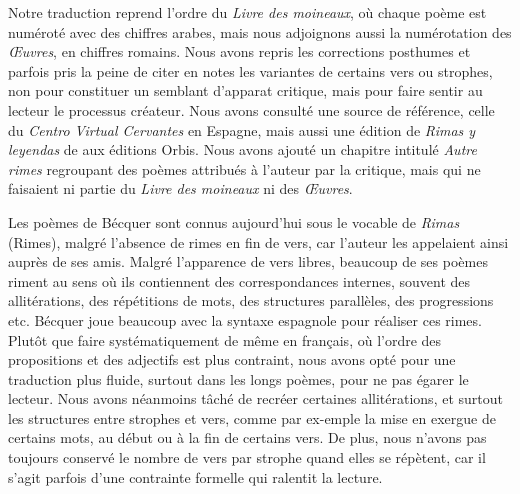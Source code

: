 






Notre traduction reprend l'ordre du \emph{Livre des moineaux}, où
chaque poème est numéroté avec des chiffres arabes, mais nous
adjoignons aussi la numérotation des \emph{Œuvres}, en chiffres
romains. Nous avons repris les corrections posthumes et parfois pris
la peine de citer en notes les variantes de certains vers ou strophes,
non pour constituer un semblant d'apparat critique, mais pour faire
sentir au lecteur le processus créateur. Nous avons consulté une
source de référence, celle du \emph{Centro Virtual Cervantes} en
Espagne, mais aussi une édition de \emph{Rimas y leyendas}
de  aux éditions Orbis. Nous avons ajouté un
chapitre intitulé \emph{Autre rimes} regroupant des poèmes attribués à
l'auteur par la critique, mais qui ne faisaient ni partie
du \emph{Livre des moineaux} ni des
\emph{Œuvres}.

Les poèmes de Bécquer sont connus aujourd'hui sous le vocable de
\emph{Rimas} (Rimes), malgré l'absence de rimes en fin de vers, car
l'auteur les appelaient ainsi auprès de ses amis. Malgré l'apparence
de vers libres, beaucoup de ses poèmes riment au sens où ils
contiennent des correspondances internes, souvent des allitérations,
des répétitions de mots, des structures parallèles, des progressions
etc. Bécquer joue beaucoup avec la syntaxe espagnole pour réaliser ces
rimes. Plutôt que faire systématiquement de même en français, où
l'ordre des propositions et des adjectifs est plus contraint, nous
avons opté pour une traduction plus fluide, surtout dans les longs
poèmes, pour ne pas égarer le lecteur. Nous avons néanmoins tâché de
recréer certaines allitérations, et surtout les structures entre
strophes et vers, comme par ex-emple la mise en exergue de certains
mots, au début ou à la fin de certains vers. De plus, nous n'avons pas
toujours conservé le nombre de vers par strophe quand elles se
répètent, car il s'agit parfois d'une contrainte formelle qui ralentit
la lecture.

